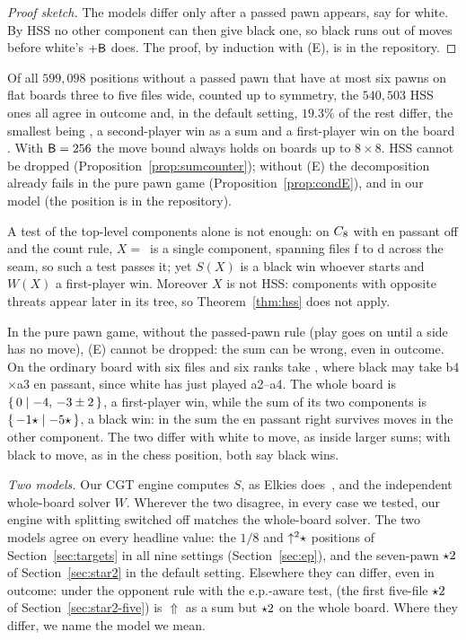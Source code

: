 \begin{proof}[Proof sketch]
The models differ only after a passed pawn appears, say for white. By HSS no other component can then give black
one, so black runs out of moves before white's $+\mathsf{B}$ does. The proof, by induction with (E),
is in the repository.
\end{proof}

Of all $599{,}098$ positions without a passed pawn that have at most six pawns on flat boards three to five
files wide, counted up to symmetry, the $540{,}503$ HSS ones all agree in outcome and, in the default setting, $19.3\%$ of the rest differ, the
smallest being , a second-player win as a sum and a first-player win on the board
. With $\mathsf{B}=256$ the move
bound always holds on boards up to $8\times8$. HSS cannot be dropped (Proposition~\ref{prop:sumcounter});
without (E) the decomposition already fails in the pure pawn game (Proposition~\ref{prop:condE}), and in our model  (the position is in the repository).

\begin{proposition}[\lab{C2}]\label{prop:sumcounter}
A test of the top-level components alone is not enough: on $C_{8}$ with en passant off and the count rule, $X=$\, is a single component, spanning files f to d across the seam, so such a test passes it; yet
$S(X)$ is a black win whoever starts and $W(X)$ a first-player win. Moreover $X$ is not HSS: components with
opposite threats appear later in its tree, so Theorem~\ref{thm:hss} does not apply.
\end{proposition}

\begin{proposition}[\lab{C1}]\label{prop:condE}
In the pure pawn game, without the passed-pawn rule (play goes on until a side has no move), (E) cannot
be dropped: the sum can be wrong, even in outcome. On the ordinary board with six files and six ranks take
, where black may take b4$\times$a3 en passant, since white has just played a2--a4. The
whole board is $\{\,0 \mid -4,\,-3\pm2\,\}$, a first-player win, while the sum of its two components is
$\{\,-1\star \mid -5\star\,\}$, a black win: in the sum the en passant right survives moves in the other component. The two differ
with white to move, as inside larger sums; with black to move, as in the chess position,
both say black wins.
\end{proposition}

\emph{Two models.} Our CGT engine computes $S$, as Elkies does~\cite{Elkies1996}, and the independent
whole-board solver $W$. Wherever the two disagree, in every case we tested,
our engine with splitting switched off matches the whole-board solver. The two models agree on every headline value: the $1/8$ and $\mathord{\uparrow^{2}}\star$
positions of Section~\ref{sec:targets} in all nine settings (Section~\ref{sec:ep}), and the seven-pawn $\mathord{\star2}$
of Section~\ref{sec:star2} in the default setting. Elsewhere they can differ, even in outcome: under the
opponent rule with the e.p.-aware test,  (the first five-file $\mathord{\star2}$ of
Section~\ref{sec:star2-five}) is ${\Uparrow}$ as a sum but $\mathord{\star2}$ on the whole board. Where they differ, we name the model we mean.

